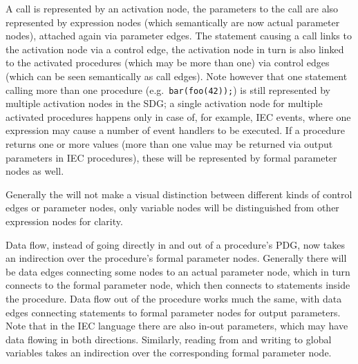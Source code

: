 A call is represented by an activation node, the parameters to the call are also represented by expression nodes (which 
semantically are now actual parameter nodes), attached again via parameter edges. The statement causing a call links to 
the activation node via a control edge, the activation node in turn is also linked to the activated procedures (which 
may be more than one) via control edges (which can be seen semantically as call edges). Note however that one statement 
calling more than one procedure (e.g.\ \lstinline|bar(foo(42));|) is still represented by multiple activation nodes in 
the SDG; a single activation node for multiple activated procedures happens only in case of, for example, IEC events, 
where one expression may cause a number of event handlers to be executed. If a procedure returns one or more values 
(more than one value may be returned via output parameters in IEC procedures), these will be represented by formal 
parameter nodes as well.

Generally the \SB will not make a visual distinction between different kinds of control edges or parameter nodes, only 
variable nodes will be distinguished from other expression nodes for clarity.

Data flow, instead of going directly in and out of a procedure's PDG, now takes an indirection over the procedure's 
formal parameter nodes. Generally there will be data edges connecting some nodes to an actual parameter node, which in 
turn connects to the formal parameter node, which then connects to statements inside the procedure. Data flow out of 
the procedure works much the same, with data edges connecting statements to formal parameter nodes for output 
parameters. Note that in the IEC language there are also in-out parameters, which may have data flowing in both 
directions. Similarly, reading from and writing to global variables takes an indirection over the corresponding formal 
parameter node.


